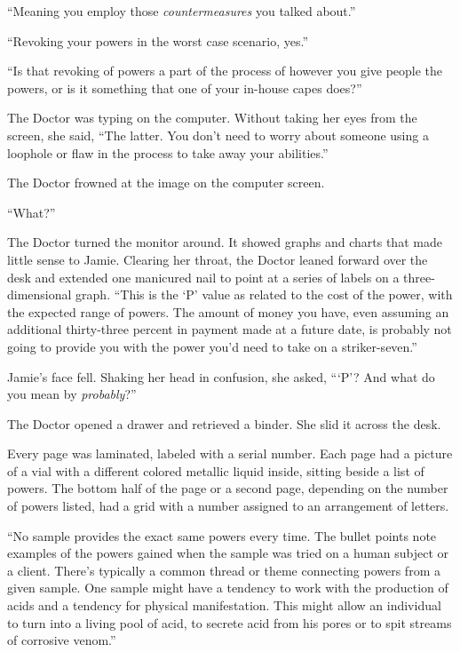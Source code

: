 ``Meaning you employ those \emph{countermeasures} you talked about.''



``Revoking your powers in the worst case scenario, yes.''



``Is that revoking of powers a part of the process of however you give people the powers, or is it something that one of your in-house capes does?''



The Doctor was typing on the computer.  Without taking her eyes from the screen, she said, ``The latter.  You don't need to worry about someone using a loophole or flaw in the process to take away your abilities.''



The Doctor frowned at the image on the computer screen.



``What?''



The Doctor turned the monitor around.  It showed graphs and charts that made little sense to Jamie.  Clearing her throat, the Doctor leaned forward over the desk and extended one manicured nail to point at a series of labels on a three-dimensional graph.  ``This is the `P' value as related to the cost of the power, with the expected range of powers.  The amount of money you have, even assuming an additional thirty-three percent in payment made at a future date, is probably not going to provide you with the power you'd need to take on a striker-seven.''



Jamie's face fell.  Shaking her head in confusion, she asked, ```P'?  And what do you mean by \emph{probably}?''



The Doctor opened a drawer and retrieved a binder.  She slid it across the desk.



Every page was laminated, labeled with a serial number.  Each page had a picture of a vial with a different colored metallic liquid inside, sitting beside a list of powers.  The bottom half of the page or a second page, depending on the number of powers listed, had a grid with a number assigned to an arrangement of letters.



``No sample provides the exact same powers every time.  The bullet points note examples of the powers gained when the sample was tried on a human subject or a client.  There's typically a common thread or theme connecting powers from a given sample.  One sample might have a tendency to work with the production of acids and a tendency for physical manifestation.  This might allow an individual to turn into a living pool of acid, to secrete acid from his pores or to spit streams of corrosive venom.''




